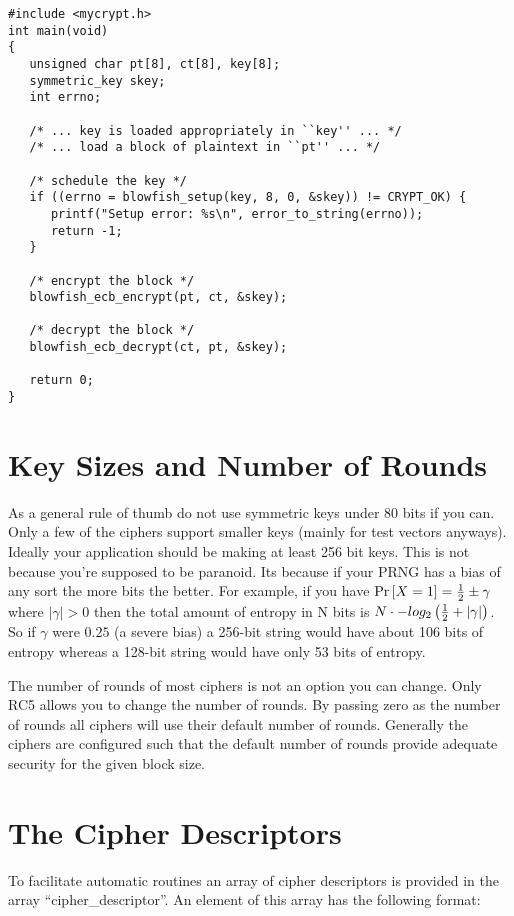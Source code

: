 \documentclass[b5paper]{book}
\begin{document}
\begin{small}
\begin{verbatim}
#include <mycrypt.h>
int main(void)
{ 
   unsigned char pt[8], ct[8], key[8];
   symmetric_key skey;
   int errno;

   /* ... key is loaded appropriately in ``key'' ... */
   /* ... load a block of plaintext in ``pt'' ... */

   /* schedule the key */
   if ((errno = blowfish_setup(key, 8, 0, &skey)) != CRYPT_OK) {
      printf("Setup error: %s\n", error_to_string(errno));
      return -1;
   }

   /* encrypt the block */
   blowfish_ecb_encrypt(pt, ct, &skey);

   /* decrypt the block */
   blowfish_ecb_decrypt(ct, pt, &skey);

   return 0;
}
\end{verbatim}
\end{small}

\section{Key Sizes and Number of Rounds}
As a general rule of thumb do not use symmetric keys under 80 bits if you can.  Only a few of the ciphers support smaller
keys (mainly for test vectors anyways).  Ideally your application should be making at least 256 bit keys.  This is not
because you're supposed to be paranoid.  Its because if your PRNG has a bias of any sort the more bits the better.  For
example, if you have $\mbox{Pr}\left[X = 1\right] = {1 \over 2} \pm \gamma$ where $\vert \gamma \vert > 0$ then the
total amount of entropy in N bits is $N \cdot -log_2\left ({1 \over 2} + \vert \gamma \vert \right)$.  So if $\gamma$
were $0.25$ (a severe bias) a 256-bit string would have about 106 bits of entropy whereas a 128-bit string would have
only 53 bits of entropy.

The number of rounds of most ciphers is not an option you can change.  Only RC5 allows you to change the number of
rounds.  By passing zero as the number of rounds all ciphers will use their default number of rounds.  Generally the
ciphers are configured such that the default number of rounds provide adequate security for the given block size.

\section{The Cipher Descriptors}
To facilitate automatic routines an array of cipher descriptors is provided in the array ``cipher\_descriptor''.  An element
of this array has the following format:
\end{document}
